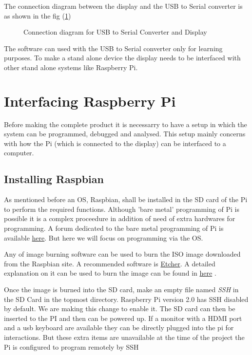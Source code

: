 \documentclass[12pt, a4paper, twoside]{article}
\begin{document}
The connection diagram between the display and the USB to Serial converter is as shown in the fig (\ref{fig_convLcdCon})

\begin{figure}
	\centering
	\scalebox{0.7}{}
	\caption{Connection diagram for USB to Serial Converter and Display}
	\label{fig_convLcdCon}
\end{figure}

The software can used with the USB to Serial converter only for learning purposes. To make a stand alone device the display needs to be interfaced with other stand alone systems like Raspberry Pi.

\section{Interfacing Raspberry Pi}
	Before making the complete product it is necessarry to have a setup in which the system can be programmed, debugged and analysed. This setup mainly concerns with how the Pi (which is connected to the display) can be interfaced to a computer. 

\subsection{Installing Raspbian}
	As mentioned before an OS, Raspbian, shall be installed in the SD card of the Pi to perform the required functions. Although 'bare metal' programming of Pi is possible it is a complex proceedure in addition of need of extra hardwares for programming. A forum dedicated to the bare metal programming of Pi is available \href{https://www.raspberrypi.org/forums/viewforum.php?f=72}{here}. But here we will focus on programming via the OS.

	Any of image burning software can be used to burn the ISO image downloaded from the Raspbian site. A recommended software is \href{https://etcher.io/}{Etcher}. A detailed explanation on it can be used to burn the image can be found in \href{https://www.raspberrypi.org/magpi/pi-sd-etcher/}{here} \cite{bib_etcher}.

	Once the image is burned into the SD card, make an empty file named \textit{SSH} in the SD Card in the topmost directory. Raspberry Pi version 2.0 has SSH disabled by default. We are making this change to enable it. The SD card can then be inserted to the PI and then can be powered up. If a monitor with a HDMI port and a usb keyboard are available they can be directly plugged into the pi for interactions. But these extra items are unavailable at the time of the project the Pi is configured to program remotely by SSH
\end{document}
